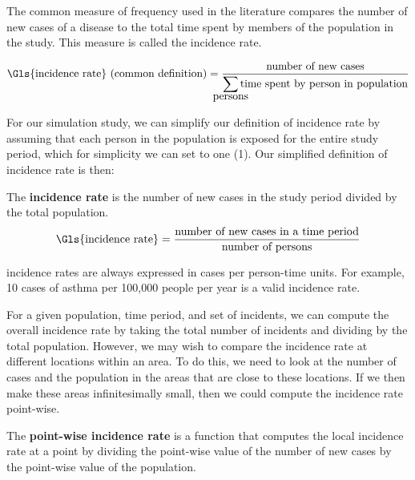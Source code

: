 The common measure of frequency used in the literature compares the number of new cases of a disease to the total time spent by members of the population in the study.
This measure is called the \gls{incidence rate}.

\begin{equation}
    \mbox{\Gls{incidence rate} (common definition)} = \frac{\mbox{number of new cases}}
                                {\displaystyle\smashoperator{\sum\limits_{\mbox{persons}}}\mbox{time spent by person in population}}
\end{equation}

For our simulation study, we can simplify our definition of \gls{incidence rate} by assuming that each person in the population is exposed for the entire study period,
which for simplicity we can set to one (1).
Our simplified definition of incidence rate is then:

\begin{defn}
    The \textbf{\gls{incidence rate}} is the number of new cases in the study period divided by the total population.
    \begin{equation}
        \label{eq:incidencerate}
        \mbox{\Gls{incidence rate}} = \frac{\mbox{number of new cases in a time period}}
                                        {\mbox{number of persons}}
    \end{equation}
\end{defn}

\Glspl{incidence rate} are always expressed in cases per person-time units.
For example, 10 cases of asthma per 100,000 people per year is a valid \gls{incidence rate}.

For a given population, time period, and set of \glspl{incident},
we can compute the overall \gls{incidence rate} by taking the total number of \glspl{incident} and dividing by the total population.
However, we may wish to compare the \gls{incidence rate} at different locations within an area.
To do this, we need to look at the number of cases and the population in the areas that are close to these locations.
If we then make these areas infinitesimally small,
then we could compute the \gls{incidence rate} point-wise.

\begin{defn}
    \label{defn:incidence_rate}
    The \textbf{point-wise \gls{incidence rate}} is a function that computes the local \gls{incidence rate} at a point by dividing the point-wise value of the number of new cases by the point-wise value of the population.
\end{defn}

